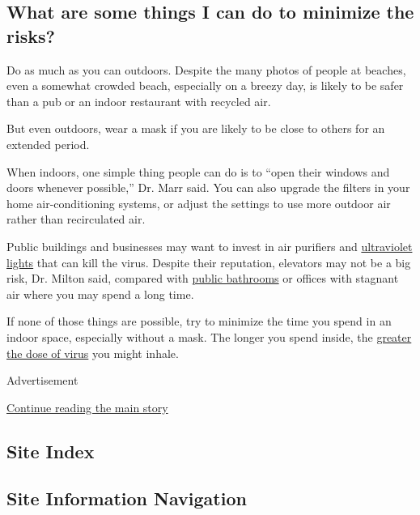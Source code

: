 \hypertarget{what-are-some-things-i-can-do-to-minimize-the-risks}{%
\subsection{What are some things I can do to minimize the
risks?}\label{what-are-some-things-i-can-do-to-minimize-the-risks}}

Do as much as you can outdoors. Despite the many photos of people at
beaches, even a somewhat crowded beach, especially on a breezy day, is
likely to be safer than a pub or an indoor restaurant with recycled air.

But even outdoors, wear a mask if you are likely to be close to others
for an extended period.

When indoors, one simple thing people can do is to ``open their windows
and doors whenever possible,'' Dr. Marr said. You can also upgrade the
filters in your home air-conditioning systems, or adjust the settings to
use more outdoor air rather than recirculated air.

Public buildings and businesses may want to invest in air purifiers and
\href{https://www.nytimes3xbfgragh.onion/2020/05/07/science/ultraviolet-light-coronavirus.html}{ultraviolet
lights} that can kill the virus. Despite their reputation, elevators may
not be a big risk, Dr. Milton said, compared with
\href{https://www.nytimes3xbfgragh.onion/2020/06/16/health/coronavirus-toilets-flushing.html}{public
bathrooms} or offices with stagnant air where you may spend a long time.

If none of those things are possible, try to minimize the time you spend
in an indoor space, especially without a mask. The longer you spend
inside, the
\href{https://www.nytimes3xbfgragh.onion/2020/05/29/health/coronavirus-transmission-dose.html}{greater
the dose of virus} you might inhale.

Advertisement

\protect\hyperlink{after-bottom}{Continue reading the main story}

\hypertarget{site-index}{%
\subsection{Site Index}\label{site-index}}

\hypertarget{site-information-navigation}{%
\subsection{Site Information
Navigation}\label{site-information-navigation}}

